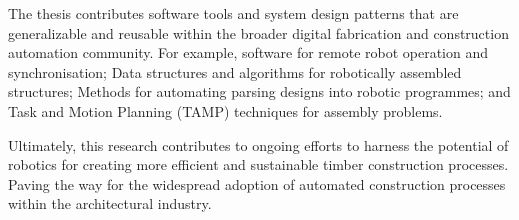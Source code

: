 \begin{adjustwidth}{20mm}{20mm}
The thesis contributes software tools and system design patterns that are generalizable and reusable within the broader digital fabrication and construction automation community. For example, software for remote robot operation and synchronisation; Data structures and algorithms for robotically assembled structures; Methods for automating parsing designs into robotic programmes; and Task and Motion Planning (TAMP) techniques for assembly problems.

Ultimately, this research contributes to ongoing efforts to harness the potential of robotics for creating more efficient and sustainable timber construction processes. Paving the way for the widespread adoption of automated construction processes within the architectural industry.
    
\end{adjustwidth}
